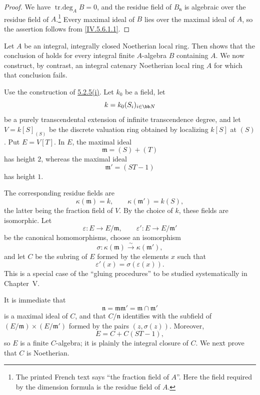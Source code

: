 \begin{proof}
We have $\operatorname{tr.deg}_A B=0$, and the residue field of
$B_{\mathfrak n}$ is algebraic over the residue field of
$A$.\footnote{The printed French text says ``the fraction field of
$A$''.  Here the field required by the dimension formula is the
residue field of $A$.}  Every maximal ideal of $B$ lies over the
maximal ideal of $A$, so the assertion follows from
\eqref{IV.5.6.1.1}.
\end{proof}

\begin{example}[5.6.11]
\label{IV.5.6.11}
Let $A$ be an integral, integrally closed Noetherian local ring.
Then  shows that the conclusion of
 holds for every integral finite $A$-algebra $B$
containing $A$.  We now construct, by contrast, an integral
catenary Noetherian local ring $A$ for which that conclusion fails.

Use the construction of {\hyperref[IV.5.2.5.i]{5.2.5\textup{(i)}}}.
Let $k_0$ be a field,
let
\[
k=k_0(S_i)_{i\in\bb N}
\]
be a purely transcendental extension of infinite transcendence
degree, and let $V=k[S]_{(S)}$ be the discrete valuation ring
obtained by localizing $k[S]$ at $(S)$.  Put $E=V[T]$.  In $E$, the
maximal ideal
\[
\mathfrak m=(S)+(T)
\]
has height $2$, whereas the maximal ideal
\[
\mathfrak m'=(ST-1)
\]
has height $1$.


The corresponding residue fields are
\[
\kappa(\mathfrak m)=k,
\qquad
\kappa(\mathfrak m')=k(S),
\]
the latter being the fraction field of $V$.  By the choice of $k$,
these fields are isomorphic.  Let
\[
\varepsilon:E\longrightarrow E/\mathfrak m,
\qquad
\varepsilon':E\longrightarrow E/\mathfrak m'
\]
be the canonical homomorphisms, choose an isomorphism
\[
\sigma:\kappa(\mathfrak m)\xrightarrow{\sim}\kappa(\mathfrak m'),
\]
and let $C$ be the subring of $E$ formed by the elements $x$ such
that
\[
\varepsilon'(x)=\sigma(\varepsilon(x)).
\]
This is a special case of the ``gluing procedures'' to be studied
systematically in Chapter~V.

It is immediate that
\[
\mathfrak n=\mathfrak m\mathfrak m'
 =\mathfrak m\cap\mathfrak m'
\]
is a maximal ideal of $C$, and that $C/\mathfrak n$ identifies with
the subfield of
$(E/\mathfrak m)\times(E/\mathfrak m')$ formed by the pairs
$(z,\sigma(z))$.  Moreover,
\[
E=C+C(ST-1),
\]
so $E$ is a finite $C$-algebra; it is plainly the integral closure
of $C$.  We next prove that $C$ is Noetherian.


\end{example}
